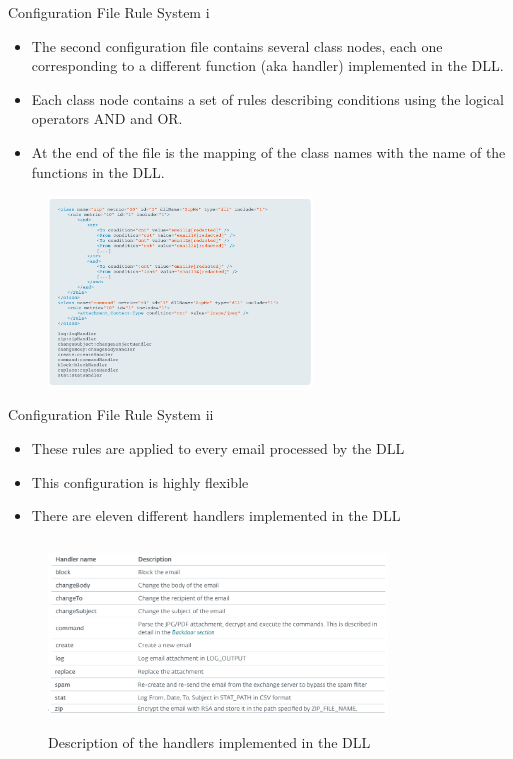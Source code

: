 \begin{frame}[fragile]{Configuration File Rule System i}
    \begin{itemize}
        \item The second configuration file contains several class nodes, each one corresponding to a different function 
        (aka handler) implemented in the DLL. 
        \item Each class node contains a set of rules describing conditions using the logical operators AND and OR. 
        \item At the end of the file is the mapping of the class names with the name of the functions in the DLL.
    \end{itemize}
    \begin{figure}
        \includegraphics[width=7cm]{figures/rule_file.PNG}
    \end{figure}
\end{frame}

\begin{frame}[fragile]{Configuration File Rule System ii}
    \begin{itemize}
        \item These rules are applied to every email processed by the DLL
        \item This configuration is highly flexible
        \item There are eleven different handlers implemented in the DLL 
    \end{itemize}
    \begin{figure}
        \includegraphics[height=5cm, width=9cm]{figures/handlers.png}
        \caption{Description of the handlers implemented in the DLL}
    \end{figure}
\end{frame}

